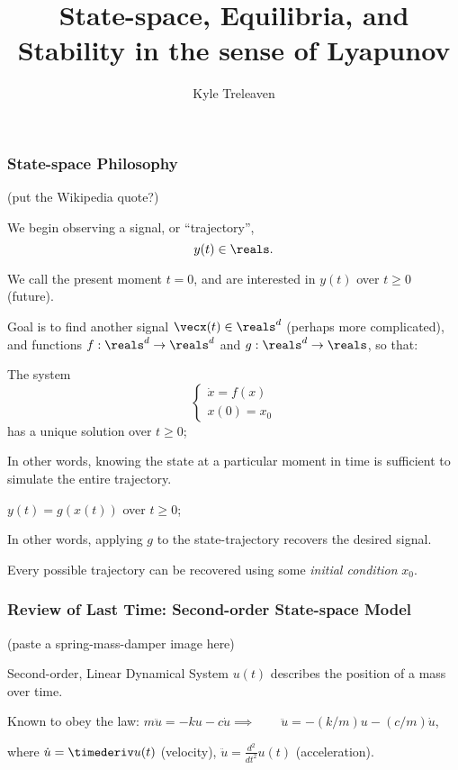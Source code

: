 \documentclass[12pt]{beamer}
\author{Kyle Treleaven}
\title{State-space, Equilibria, and Stability in the sense of Lyapunov}
\begin{document}
\begin{frame}
\titlepage

\end{frame}



\begin{frame}
\frametitle{State-space Philosophy}

(put the Wikipedia quote?)

\begin{itemize}
\vitem We begin observing a signal, or ``trajectory'',
\[
y(t) \in \reals.
\]

\vitem We call the present moment $t=0$, and are interested in $y(t)$ over $t \geq 0$ (future).


\vitem Goal is to find another signal $\vecx(t) \in \reals^d$ (perhaps more complicated), and functions $f : \reals^d \to \reals^d$ and $g : \reals^d \to \reals$, so that:

\begin{enumerate}
\vitem The system
\[
\begin{cases}
	\dot x = f(x) \\
	x(0) = x_0
\end{cases}
\]
has a unique solution over $t \geq 0$;

In other words, knowing the state at a particular moment in time is sufficient to simulate the entire trajectory.

\vitem $y(t) = g( x(t) )$ over $t \geq 0$;

In other words, applying $g$ to the state-trajectory recovers the desired signal.

\vitem Every possible trajectory can be recovered using some \emph{initial condition} $x_0$.

\end{enumerate}


\end{itemize}

\vfill\null
\end{frame}



\begin{frame}
\frametitle{Review of Last Time: Second-order State-space Model}

(paste a spring-mass-damper image here)

\begin{block}{Second-order, Linear Dynamical System}
$u(t)$ describes the position of a mass over time.

Known to obey the law:
$m \ddot u = -k u - c \dot u
	\implies\qquad
	\ddot u = -(k/m) u - (c/m) \dot u$,
	
where $\dot u = \timederiv u(t)$ (velocity), $\ddot u = \frac{d^2}{dt^2} u(t)$ (acceleration).
\end{block}

\end{frame}
\end{document}
